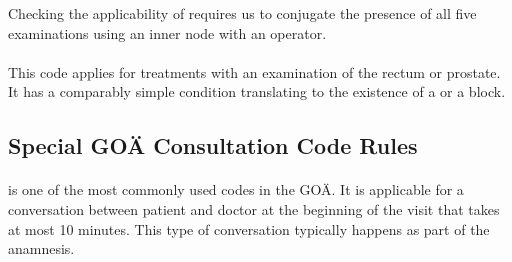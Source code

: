 

Checking the applicability of  requires us to conjugate the presence of all five examinations using an inner node with an  operator.

\paragraph{}
This code applies for treatments with an examination of the rectum or prostate.
It has a comparably simple condition translating to the existence of a  or a  block.





%


\subsection{Special GOÄ Consultation Code Rules}\label{subsec:special-consultation-code-rules}

\paragraph{}\label{par:goa-1}
 is one of the most commonly used codes in the GOÄ.
It is applicable for a conversation between patient and doctor at the beginning of the visit that takes at most 10 minutes.
This type of conversation typically happens as part of the anamnesis.

